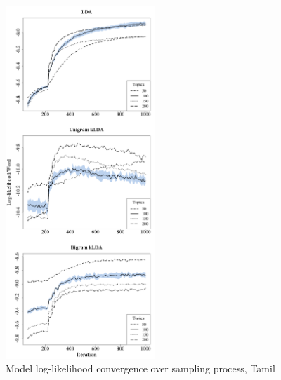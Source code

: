 \begin{figure}[t]
\begin{center}
\includegraphics[width=0.5\textwidth]{graphs/ch6/ll/tamil-lda-ll.png}
\end{center}
\caption[Log-Likelihood convergence, Tamil]{Model log-likelihood convergence over sampling process, Tamil\label{figC:llTamil}}
\end{figure}


